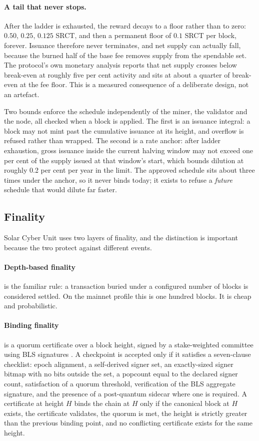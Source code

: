 \documentclass{article}
\begin{document}
\paragraph{A tail that never stops.} After the ladder is exhausted, the reward
decays to a floor rather than to zero: $0.50$, $0.25$, $0.125$ SRCT, and then
a permanent floor of $0.1$ SRCT per block, forever. Issuance therefore never
terminates, and net supply can actually fall, because the burned half of the
base fee removes supply from the spendable set. The protocol's own monetary
analysis reports that net supply crosses below break-even at roughly five per
cent activity and sits at about a quarter of break-even at the fee floor. This
is a measured consequence of a deliberate design, not an artefact.

Two bounds enforce the schedule independently of the miner, the validator and
the node, all checked when a block is applied. The first is an issuance
integral: a block may not mint past the cumulative issuance at its height, and
overflow is refused rather than wrapped. The second is a rate anchor: after
ladder exhaustion, gross issuance inside the current halving window may not
exceed one per cent of the supply issued at that window's start, which bounds
dilution at roughly 0.2 per cent per year in the limit. The approved schedule
sits about three times under the anchor, so it never binds today; it exists to
refuse a \emph{future} schedule that would dilute far faster.

\subsection{Finality}
\label{sec:finality}

Solar Cyber Unit uses two layers of finality, and the distinction is important because
the two protect against different events.

\paragraph{Depth-based finality} is the familiar rule: a transaction buried
under a configured number of blocks is considered settled. On the mainnet
profile this is one hundred blocks. It is cheap and probabilistic.

\paragraph{Binding finality} is a quorum certificate over a block height,
signed by a stake-weighted committee using BLS signatures
\cite{boneh2003aggregate,bls-signature2022}. A checkpoint is accepted only if
it satisfies a seven-clause checklist: epoch alignment, a self-derived signer
set, an exactly-sized signer bitmap with no bits outside the set, a popcount
equal to the declared signer count, satisfaction of a quorum threshold,
verification of the BLS aggregate signature, and the presence of a
post-quantum sidecar where one is required. A certificate at height $H$ binds
the chain at $H$ only if the canonical block at $H$ exists, the certificate
validates, the quorum is met, the height is strictly greater than the previous
binding point, and no conflicting certificate exists for the same height.
\end{document}
